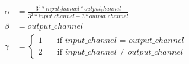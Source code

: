 \documentclass{article}
\begin{document}
\begin{align*}
\alpha &= \frac{3^3*input_channel*output_channel}{3^2*input\_channel+3*output\_channel}\\
\beta &= output\_channel\\
\gamma &=
  \begin{cases}
    1       & \quad \text{if } input\_channel \text{ = } output\_channel\\
    2  & \quad \text{if } input\_channel  \neq  output\_channel
  \end{cases}
\end{align*}
\end{document}
